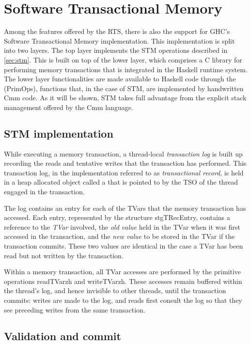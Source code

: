 \section{Software Transactional Memory}

Among the features offered by the RTS, there is also the support for GHC's Software Transactional Memory implementation.
This implementation is split into two layers.
The top layer implements the STM operations described in \cref{sec:stm}.
This is built on top of the lower layer, which comprises a C library for performing memory transactions that is integrated in the Haskell runtime system.
The lower layer functionalities are made available to Haskell code through the  (PrimOps), \ie functions that, in the case of STM, are implemented by handwritten Cmm code.
As it will be shown, STM takes full advantage from the explicit stack management offered by the Cmm language.

\subsection{STM implementation}
While executing a memory transaction, a thread-local \emph{transaction log} is built up recording the reads and tentative writes that the transaction has performed.
This transaction log, in the implementation referred to as \emph{transactional record}, is held in a heap allocated object called a  that is pointed to by the TSO of the thread engaged in the transaction.

The log contains an entry for each of the TVars that the memory transaction has accessed.
Each entry, represented by the structure stgTRecEntry, contains a reference to the \emph{TVar} involved, the \emph{old value} held in the TVar when it was first accessed in the transaction, and the \emph{new value} to be stored in the TVar if the transaction commits.
These two values are identical in the case a TVar has been read but not written by the transaction.

Within a memory transaction, all TVar accesses are performed by the primitive operations readTVarzh and writeTVarzh. These accesses remain buffered within the thread’s log, and hence invisible to other threads, until the transaction commits: writes are made to the log, and reads first consult the log so that they see preceding writes from the same transaction.

\subsection{Validation and commit}

